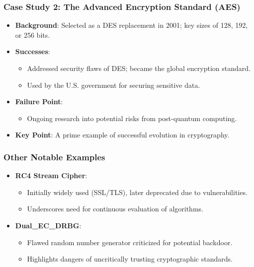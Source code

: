 \documentclass{beamer}
\begin{document}
\begin{frame}[fragile]
    \frametitle{Case Study 2: The Advanced Encryption Standard (AES)}
    \begin{itemize}
        \item \textbf{Background}: Selected as a DES replacement in 2001; key sizes of 128, 192, or 256 bits.
        \item \textbf{Successes}:
            \begin{itemize}
                \item Addressed security flaws of DES; became the global encryption standard.
                \item Used by the U.S. government for securing sensitive data.
            \end{itemize}
        \item \textbf{Failure Point}:
            \begin{itemize}
                \item Ongoing research into potential risks from post-quantum computing.
            \end{itemize}
        \item \textbf{Key Point}: A prime example of successful evolution in cryptography.
    \end{itemize}
\end{frame}

\begin{frame}[fragile]
    \frametitle{Other Notable Examples}
    \begin{itemize}
        \item \textbf{RC4 Stream Cipher}: 
            \begin{itemize}
                \item Initially widely used (SSL/TLS), later deprecated due to vulnerabilities.
                \item Underscores need for continuous evaluation of algorithms.
            \end{itemize}
        \item \textbf{Dual\_EC\_DRBG}: 
            \begin{itemize}
                \item Flawed random number generator criticized for potential backdoor.
                \item Highlights dangers of uncritically trusting cryptographic standards.
            \end{itemize}
    \end{itemize}
\end{frame}
\end{document}
